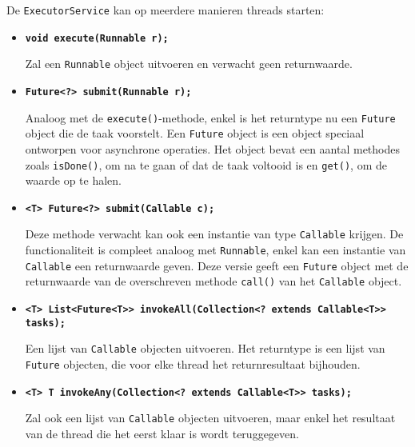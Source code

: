 \documentclass{report}
\begin{document}
De \texttt{ExecutorService} kan op meerdere manieren threads starten:
\begin{itemize}
	\item[\info] \textbf{\texttt{void execute(Runnable r);}} 
	
	Zal een \texttt{Runnable} object uitvoeren en verwacht geen returnwaarde.

	\item[\info] \textbf{\texttt{Future<?> submit(Runnable r);}} 

	Analoog met de \texttt{execute()}-methode, enkel is het returntype nu een \texttt{Future} object die de taak voorstelt. Een \texttt{Future} object is een object speciaal ontworpen voor asynchrone operaties. Het object bevat een aantal methodes zoals \texttt{isDone()}, om na te gaan of dat de taak voltooid is en \texttt{get()}, om de waarde op te halen.

	\item[\info] \textbf{\texttt{<T> Future<?> submit(Callable c);}} 
	
	Deze methode verwacht kan ook een instantie van type \texttt{Callable} krijgen. De functionaliteit is compleet analoog met \texttt{Runnable}, enkel kan een instantie van \texttt{Callable} een returnwaarde geven. Deze versie geeft een \texttt{Future} object met de returnwaarde van de overschreven methode \texttt{call()} van het \texttt{Callable} object. 

	\item[\info] \textbf{\texttt{<T> List<Future<T>> invokeAll(Collection<? extends Callable<T>> tasks);}}

	Een lijst van \texttt{Callable} objecten uitvoeren. Het returntype is een lijst van \texttt{Future} objecten, die voor elke thread het returnresultaat bijhouden.
	\item[\info] \textbf{\texttt{<T> T invokeAny(Collection<? extends Callable<T>> tasks);}}

	Zal ook een lijst van \texttt{Callable} objecten uitvoeren, maar enkel het resultaat van de thread die het eerst klaar is wordt teruggegeven. 
\end{itemize}
\end{document}
